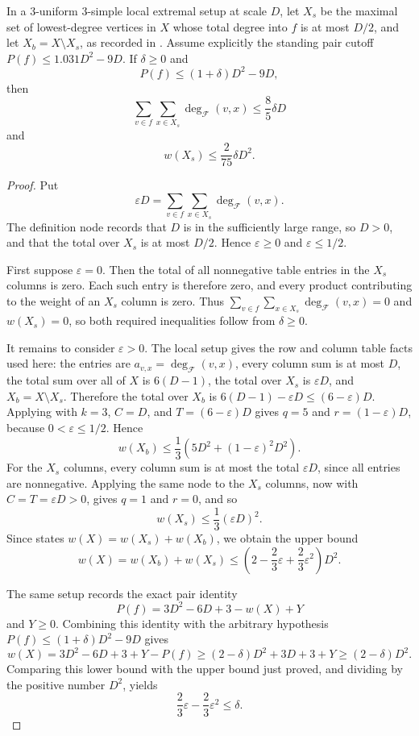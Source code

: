\begin{lemma}
In a $3$-uniform $3$-simple local extremal setup at scale $D$, let
$X_s$ be the maximal set of lowest-degree vertices in $X$ whose total degree
into $f$ is at most $D/2$, and let $X_b=X\setminus X_s$, as recorded in
.  Assume explicitly the standing
pair cutoff $P(f)\le1.031D^2-9D$.  If $\delta\ge0$ and
\[
P(f)\le (1+\delta)D^2-9D,
\]
then
\[
\sum_{v\in f}\sum_{x\in X_s}\deg_{\mathcal F}(v,x)
\le \frac85\delta D
\]
and
\[
w(X_s)\le \frac{2}{75}\delta D^2 .
\]
\end{lemma}
\begin{proof}
Put
\[
\varepsilon D=
\sum_{v\in f}\sum_{x\in X_s}\deg_{\mathcal F}(v,x).
\]
The definition node  records that
$D$ is in the sufficiently large range, so $D>0$, and that the total over
$X_s$ is at most $D/2$.  Hence $\varepsilon\ge0$ and
$\varepsilon\le1/2$.

First suppose $\varepsilon=0$.  Then the total of all nonnegative table
entries in the $X_s$ columns is zero.  Each such entry is therefore zero, and
every product contributing to the weight of an $X_s$ column is zero.  Thus
$\sum_{v\in f}\sum_{x\in X_s}\deg_{\mathcal F}(v,x)=0$ and
$w(X_s)=0$, so both required inequalities follow from $\delta\ge0$.

It remains to consider $\varepsilon>0$.  The local setup gives the row and
column table facts used here: the entries are
$a_{v,x}=\deg_{\mathcal F}(v,x)$, every column sum is at most $D$, the total
sum over all of $X$ is $6(D-1)$, the total over $X_s$ is $\varepsilon D$,
and $X_b=X\setminus X_s$.  Therefore the total over $X_b$ is
$6(D-1)-\varepsilon D\le (6-\varepsilon)D$.  Applying
 with $k=3$, $C=D$, and
$T=(6-\varepsilon)D$ gives $q=5$ and $r=(1-\varepsilon)D$, because
$0<\varepsilon\le1/2$.  Hence
\[
w(X_b)\le \frac13\left(5D^2+(1-\varepsilon)^2D^2\right).
\]
For the $X_s$ columns, every column sum is at most the total
$\varepsilon D$, since all entries are nonnegative.  Applying the same node
to the $X_s$ columns, now with $C=T=\varepsilon D>0$, gives $q=1$ and
$r=0$, and so
\[
w(X_s)\le \frac13(\varepsilon D)^2.
\]
Since  states
$w(X)=w(X_s)+w(X_b)$, we obtain the upper bound
\[
w(X)=w(X_b)+w(X_s)
\le \left(2-\frac23\varepsilon+\frac23\varepsilon^2\right)D^2 .
\]

The same setup records the exact pair identity
\[
P(f)=3D^2-6D+3-w(X)+Y
\]
and $Y\ge0$.  Combining this identity with the arbitrary hypothesis
$P(f)\le(1+\delta)D^2-9D$ gives
\[
w(X)=3D^2-6D+3+Y-P(f)
\ge (2-\delta)D^2+3D+3+Y
\ge (2-\delta)D^2.
\]
Comparing this lower bound with the upper bound just proved, and dividing by
the positive number $D^2$, yields
\[
\frac23\varepsilon-\frac23\varepsilon^2\le\delta .
\]


\end{proof}
